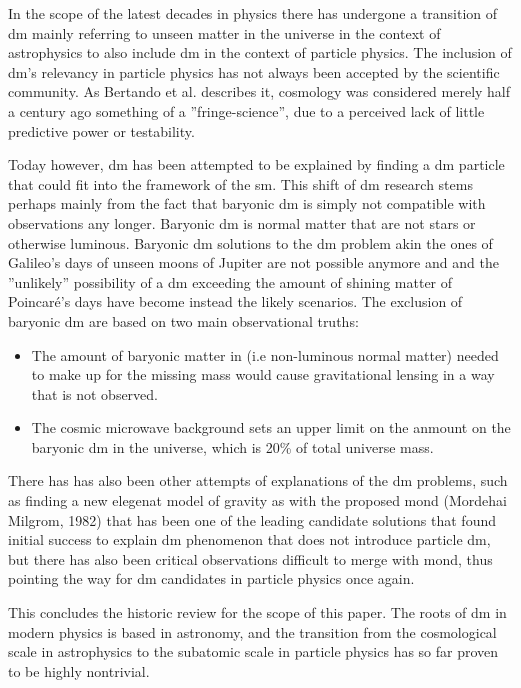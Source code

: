 In the scope of the latest decades in physics there has undergone a transition of \gls{dm} mainly referring to unseen matter in the universe in the context of astrophysics to also include \gls{dm} in the context of particle physics. The inclusion of \gls{dm}'s relevancy in particle physics has not always been accepted by the scientific community. As Bertando et al. describes it, cosmology was considered merely half a century ago something of a ''fringe-science'', due to a perceived lack of little predictive power or testability. 

Today however, \gls{dm} has been attempted to be explained by finding a \gls{dm} particle that could fit into the framework of the \gls{sm}. This shift of \gls{dm} research stems perhaps mainly from the fact that baryonic \gls{dm} is simply not compatible with observations any longer. Baryonic \gls{dm} is normal matter that are not stars or otherwise luminous. Baryonic \gls{dm} solutions to the \gls{dm} problem akin the ones of Galileo’s days of unseen moons of Jupiter are not possible anymore and and the ''unlikely'' possibility of a \gls{dm} exceeding the amount of shining matter of Poincaré's days have become instead the likely scenarios. The exclusion of baryonic \gls{dm} are based on two main observational truths: 

\begin{itemize}
    \item The amount of baryonic matter in (i.e non-luminous normal matter) needed to make up for the missing mass would cause gravitational lensing in a way that is not observed. 
    \item The cosmic microwave background sets an upper limit on the anmount on the baryonic \gls{dm} in the universe, which is 20\% of total universe mass. 
\end{itemize}

There has has also been other attempts of explanations of the \gls{dm} problems, such as finding a new elegenat model of gravity as with the proposed \gls{mond} (Mordehai Milgrom, 1982) that has been one of the leading candidate solutions that found initial success to explain \gls{dm} phenomenon that does not introduce particle \gls{dm}, but there has also been critical observations difficult to merge with \gls{mond}, thus pointing the way for \gls{dm} candidates in particle physics once again. 

This concludes the historic review for the scope of this paper. The roots of \gls{dm} in modern physics is based in astronomy, and the transition from the cosmological scale in astrophysics to the subatomic scale in particle physics has so far proven to be highly nontrivial.

